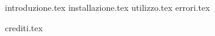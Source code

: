 \mainmatter
{introduzione.tex}
\cleardoublepage
{installazione.tex}
\cleardoublepage
{utilizzo.tex}
\cleardoublepage
{errori.tex}
\cleardoublepage

\appendix
{crediti.tex}
\cleardoublepage